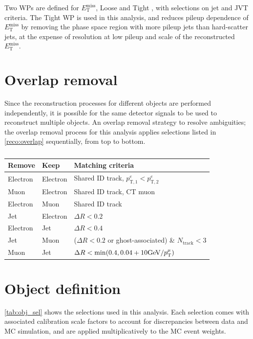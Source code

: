 \documentclass[../thesis.tex]{subfiles}
\begin{document}
Two WPs are defined for $E_\mathrm{T}^\mathrm{miss}$, Loose and Tight \citep{reco:met2}, with selections on jet \pT and JVT criteria. The Tight WP is used in this analysis, and reduces pileup dependence of $E_\mathrm{T}^\mathrm{miss}$ by removing the phase space region with more pileup jets than hard-scatter jets, at the expense of resolution at low pileup and scale of the reconstructed $E_\mathrm{T}^\mathrm{miss}$.

\section{Overlap removal}
Since the reconstruction processes for different objects are performed independently, it is possible for the same detector signals to be used to reconstruct multiple objects. An overlap removal strategy to resolve ambiguities; the overlap removal process for this analysis applies selections listed in \autoref{reco:overlap} sequentially, from top to bottom.

\begin{table}[!ht]
\centering
\caption{\label{reco:overlap}\citep{reco:overlap}}%
\begin{tabular}{lll}
\toprule
Remove		& Keep		& Matching criteria \\
\midrule
Electron	& Electron 	& Shared ID track, $p^e_\mathrm{T,1}<p^e_\mathrm{T,2}$ \\
Muon		& Electron	& Shared ID track, CT muon \\
Electron	& Muon		& Shared ID track \\
Jet			& Electron	& $\Delta R <0.2$ \\
Electron	& Jet		& $\Delta R <0.4$ \\
Jet			& Muon		& ($\Delta R <0.2$ or ghost-associated) \& $N_\text{track}<3$ \\
Muon		& Jet		& $\Delta R < \min(0.4, 0.04+10 \text{GeV/\ensuremath{p_\mathrm{T}^\mu}})$ \\
\bottomrule
\end{tabular}
\end{table}

\section{Object definition}
\label{sec:objdef}
\autoref{tab:obj_sel} shows the selections used in this analysis. Each selection comes with associated calibration scale factors to account for discrepancies between data and MC simulation, and are applied multiplicatively to the MC event weights.
\end{document}
